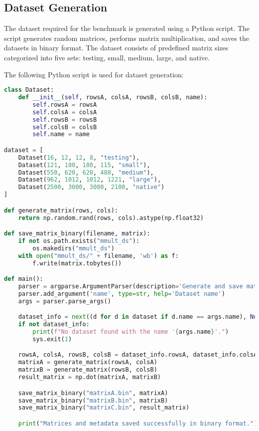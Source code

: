 \documentclass[12pt]{article}
\begin{document}
\subsection{Dataset Generation}
The dataset required for the benchmark is generated using a Python script. The script generates random matrices, performs matrix multiplication, and saves the datasets in binary format. The dataset consists of predefined matrix sizes categorized into five sets: testing, small, medium, large, and native.

The following Python script is used for dataset generation:
\begin{lstlisting}[language=Python, style=customc, caption=Dataset Generation Script]
class Dataset:
    def __init__(self, rowsA, colsA, rowsB, colsB, name):
        self.rowsA = rowsA
        self.colsA = colsA
        self.rowsB = rowsB
        self.colsB = colsB
        self.name = name

dataset = [
    Dataset(16, 12, 12, 8, "testing"),
    Dataset(121, 180, 180, 115, "small"),
    Dataset(550, 620, 620, 480, "medium"),
    Dataset(962, 1012, 1012, 1221, "large"),
    Dataset(2500, 3000, 3000, 2100, "native")
]

def generate_matrix(rows, cols):
    return np.random.rand(rows, cols).astype(np.float32)

def save_matrix_binary(filename, matrix):
    if not os.path.exists("mmult_ds"):
        os.makedirs("mmult_ds")
    with open("mmult_ds/" + filename, 'wb') as f:
        f.write(matrix.tobytes())

def main():
    parser = argparse.ArgumentParser(description='Generate and save matrices in binary format.')
    parser.add_argument('name', type=str, help='Dataset name')
    args = parser.parse_args()

    dataset_info = next((d for d in dataset if d.name == args.name), None)
    if not dataset_info:
        print(f"No dataset found with the name '{args.name}'.")
        sys.exit(1)

    rowsA, colsA, rowsB, colsB = dataset_info.rowsA, dataset_info.colsA, dataset_info.rowsB, dataset_info.colsB
    matrixA = generate_matrix(rowsA, colsA)
    matrixB = generate_matrix(rowsB, colsB)
    result_matrix = np.dot(matrixA, matrixB)

    save_matrix_binary("matrixA.bin", matrixA)
    save_matrix_binary("matrixB.bin", matrixB)
    save_matrix_binary("matrixC.bin", result_matrix)

    print("Matrices and metadata saved successfully in binary format.")

\end{lstlisting}
\end{document}
